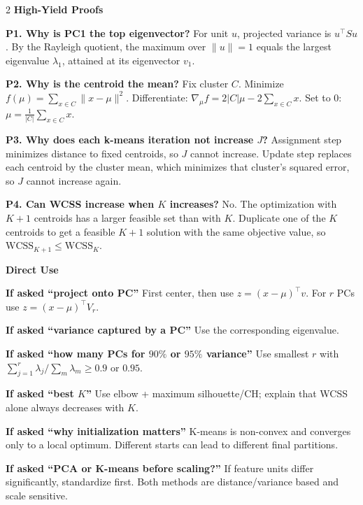 \documentclass[10pt,fleqn]{article}
\newcommand{\shead}[1]{\vspace{0.1ex}\textbf{\scriptsize #1}\par}
\newcommand{\qa}[2]{\textbf{#1} #2\par}
\begin{document}
\begin{multicols*}{2}
\shead{High-Yield Proofs}
\qa{P1. Why is PC1 the top eigenvector?}{For unit \(u\), projected variance is \(u^\top Su\). By the Rayleigh quotient, the maximum over \(\|u\|=1\) equals the largest eigenvalue \(\lambda_1\), attained at its eigenvector \(v_1\).}
\qa{P2. Why is the centroid the mean?}{Fix cluster \(C\). Minimize \(f(\mu)=\sum_{x\in C}\|x-\mu\|^2\). Differentiate: \(\nabla_\mu f=2|C|\mu-2\sum_{x\in C}x\). Set to \(0\): \(\mu=\frac1{|C|}\sum_{x\in C}x\).}
\qa{P3. Why does each k-means iteration not increase \(J\)?}{Assignment step minimizes distance to fixed centroids, so \(J\) cannot increase. Update step replaces each centroid by the cluster mean, which minimizes that cluster's squared error, so \(J\) cannot increase again.}
\qa{P4. Can WCSS increase when \(K\) increases?}{No. The optimization with \(K+1\) centroids has a larger feasible set than with \(K\). Duplicate one of the \(K\) centroids to get a feasible \(K+1\) solution with the same objective value, so \(\mathrm{WCSS}_{K+1}\le \mathrm{WCSS}_{K}\).}

\shead{Direct Use}
\qa{If asked ``project onto PC''}{First center, then use \(z=(x-\mu)^\top v\). For \(r\) PCs use \(z=(x-\mu)^\top V_r\).}
\qa{If asked ``variance captured by a PC''}{Use the corresponding eigenvalue.}
\qa{If asked ``how many PCs for \(90\%\) or \(95\%\) variance''}{Use smallest \(r\) with \(\sum_{j=1}^r\lambda_j/\sum_m\lambda_m\ge 0.9\) or \(0.95\).}
\qa{If asked ``best \(K\)''}{Use elbow + maximum silhouette/CH; explain that WCSS alone always decreases with \(K\).}
\qa{If asked ``why initialization matters''}{K-means is non-convex and converges only to a local optimum. Different starts can lead to different final partitions.}
\qa{If asked ``PCA or K-means before scaling?''}{If feature units differ significantly, standardize first. Both methods are distance/variance based and scale sensitive.}


\end{multicols*}
\end{document}
